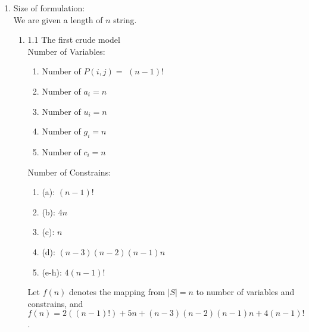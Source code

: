 \documentclass[11pt]{article}
\begin{document}
{\begin{enumerate}
\begin{enumerate}
    \item $2F(i,j)-Q(i,j)+Q(i-1,j+1) \leq 1$,  $\forall i,j\in \{1,\dots,n\}$. If $F(i,j)$ is set to 1, then both $Q(i,j)$ and $Q(i-1,j+1)$ need to be set to 1.
    
    \item $P(i,j)-P(i-1,j+1)-L(i,j) \leq 0$,  $\forall i,j\in \{1,\dots,n\}$. If $(i,j)$ pair is the last pair in its quartet, and $(i+1,j-1)$ is the last pair in its quartet accordingly, then the stacked quartet of $(i,i+1,j,j-1)$ is the last quartet in its stacked quartet.

    \item $2L(i,j)-P(i,j)+P(i-1,j+1) \leq 1$,  $\forall i,j\in \{1,\dots,n\}$. If $L(i,j)$ is set to 1, then both $Q(i,j)$ and $Q(i-1,j+1)$ need to be set to 1.

    \item $\forall i,j\in \{1,\dots,n\}$, $W(i,j) = F(i,j)*W(i,j)+W(i,j)$. Doubled the weight if its first quartet.

    \item $\forall i,j\in \{1,\dots,n\}$, $W(i,j) = L(i,j)*W(i,j)+W(i,j)$. Doubled the weight if its last quartet.
    
\end{enumerate}


\item Size of formulation:\\
We are given a length of $n$ string.
\begin{enumerate}
    \item 1.1 The first crude model\\
    Number of Variables:
    \begin{enumerate}
        \item Number of $P(i,j)=$ $(n-1)!$
        \item Number of $a_i = n$
        \item Number of $u_i = n$
        \item Number of $g_i = n$
        \item Number of $c_i = n$
    \end{enumerate}
    Number of Constrains:
    \begin{enumerate}
        \item (a): $(n-1)!$
        \item (b): $4n$
        \item (c): $n$
        \item (d): $(n-3)(n-2)(n-1)n$
        \item (e-h): $4(n-1)!$
    \end{enumerate}
    Let $f(n)$ denotes the mapping from $|S|=n$ to number of variables and constrains, and $f(n)=2((n-1)!)+5n+(n-3)(n-2)(n-1)n+4(n-1)!$.
    

\end{enumerate}
\end{enumerate}}
\end{document}
